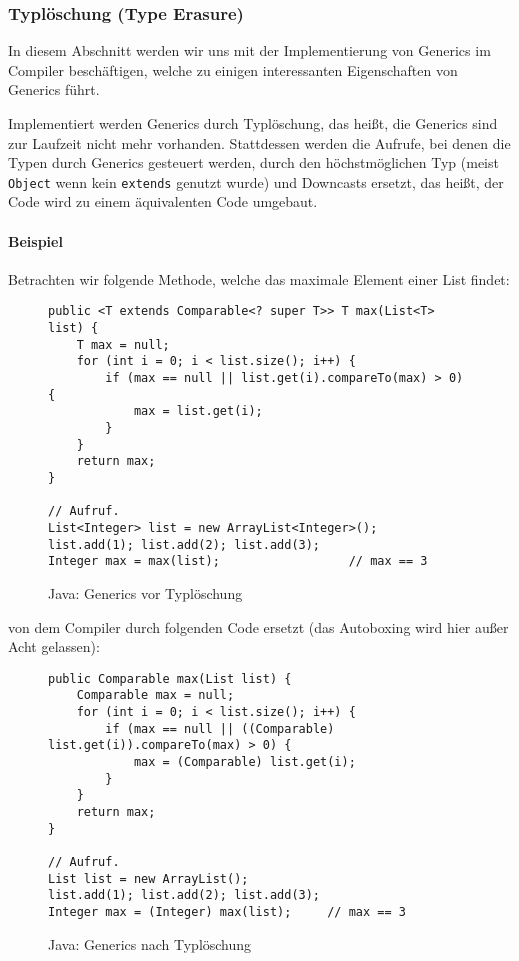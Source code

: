 	
	\subsubsection{Typlöschung (Type Erasure)}
		In diesem Abschnitt werden wir uns mit der Implementierung von Generics im Compiler beschäftigen, welche zu einigen interessanten Eigenschaften von Generics führt.
		
		Implementiert werden Generics durch Typlöschung, das heißt, die Generics sind zur Laufzeit nicht mehr vorhanden. Stattdessen werden die Aufrufe, bei denen die Typen durch Generics gesteuert werden, durch den höchstmöglichen Typ (meist \texttt{Object} wenn kein \texttt{extends} genutzt wurde) und Downcasts ersetzt, das heißt, der Code wird zu einem äquivalenten Code umgebaut.
		
		\paragraph{Beispiel}
			Betrachten wir folgende Methode, welche das maximale Element einer List findet:
			\begin{figure}[H]
				\centering
				\begin{lstlisting}[style = base]
public <T extends Comparable<? super T>> T max(List<T> list) {
	T max = null;
	for (int i = 0; i < list.size(); i++) {
		if (max == null || list.get(i).compareTo(max) > 0) {
			max = list.get(i);
		}
	}
	return max;
}

// Aufruf.
List<Integer> list = new ArrayList<Integer>();
list.add(1); list.add(2); list.add(3);
Integer max = max(list);                  // max == 3
				\end{lstlisting}
				\caption{Java: Generics vor Typlöschung}
			\end{figure}
			von dem Compiler durch folgenden Code ersetzt (das Autoboxing wird hier außer Acht gelassen):
			\begin{figure}[H]
				\centering
				\begin{lstlisting}[style = base]
public Comparable max(List list) {
	Comparable max = null;
	for (int i = 0; i < list.size(); i++) {
		if (max == null || ((Comparable) list.get(i)).compareTo(max) > 0) {
			max = (Comparable) list.get(i);
		}
	}
	return max;
}

// Aufruf.
List list = new ArrayList();
list.add(1); list.add(2); list.add(3);
Integer max = (Integer) max(list);     // max == 3
				\end{lstlisting}
				\caption{Java: Generics nach Typlöschung}
			\end{figure}
	
